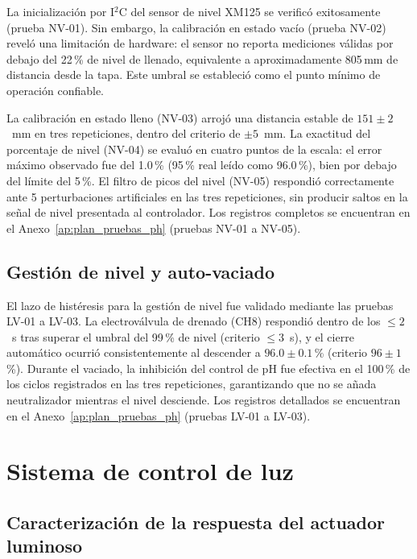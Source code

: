 La inicialización por I$^2$C del sensor de nivel XM125 se verificó exitosamente
(prueba NV-01). Sin embargo, la calibración en estado vacío (prueba NV-02) reveló
una limitación de hardware: el sensor no reporta mediciones válidas por debajo del
22\,\% de nivel de llenado, equivalente a aproximadamente 805\,mm de distancia
desde la tapa. Este umbral se estableció como el punto mínimo de operación confiable.

La calibración en estado lleno (NV-03) arrojó una distancia estable de
$151 \pm 2$~mm en tres repeticiones, dentro del criterio de $\pm 5$~mm. La
exactitud del porcentaje de nivel (NV-04) se evaluó en cuatro puntos de la escala:
el error máximo observado fue del 1.0\,\% (95\,\% real leído como 96.0\,\%), bien por
debajo del límite del 5\,\%. El filtro de picos del nivel (NV-05) respondió
correctamente ante 5 perturbaciones artificiales en las tres repeticiones, sin
producir saltos en la señal de nivel presentada al controlador. Los registros
completos se encuentran en el Anexo~\ref{ap:plan_pruebas_ph} (pruebas NV-01 a NV-05).

\subsection{Gestión de nivel y auto-vaciado}

El lazo de histéresis para la gestión de nivel fue validado mediante las pruebas
LV-01 a LV-03. La electroválvula de drenado (CH8) respondió dentro de los
$\leq 2$~s tras superar el umbral del 99\,\% de nivel (criterio $\leq 3$~s), y el
cierre automático ocurrió consistentemente al descender a $96.0 \pm 0.1$\,\%
(criterio $96 \pm 1$\,\%). Durante el vaciado, la inhibición del control de pH fue
efectiva en el 100\,\% de los ciclos registrados en las tres repeticiones,
garantizando que no se añada neutralizador mientras el nivel desciende. Los
registros detallados se encuentran en el Anexo~\ref{ap:plan_pruebas_ph}
(pruebas LV-01 a LV-03).

\section{Sistema de control de luz}

\subsection{Caracterización de la respuesta del actuador luminoso}

